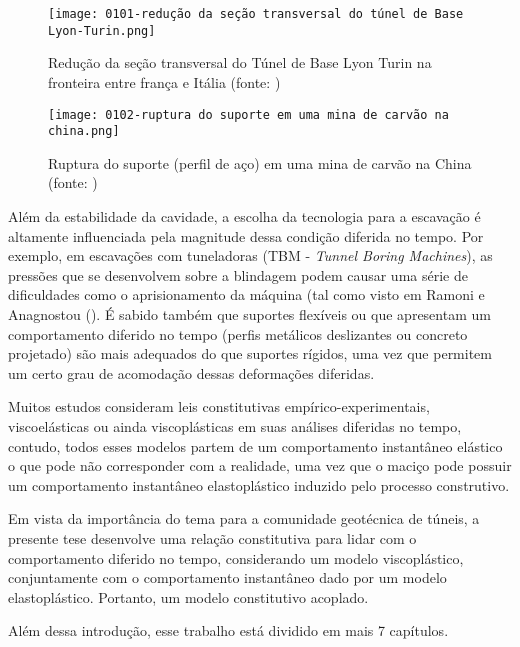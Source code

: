 \begin{figure}[H]
	\begin{center}
		\texttt{[image: 0101-redução da seção transversal do túnel de Base Lyon-Turin.png]}
	\end{center}
	\caption{\label{redução_base_turin}Redução da seção transversal do Túnel de Base Lyon Turin na fronteira entre frança e Itália (fonte: )}
\end{figure}

\begin{figure}[H]
	\begin{center}
		\texttt{[image: 0102-ruptura do suporte em uma mina de carvão na china.png]}
	\end{center}
	\caption{\label{ruptura_china}Ruptura do suporte (perfil de aço) em uma mina de carvão na China (fonte: )}
\end{figure}
 
Além da estabilidade da cavidade, a escolha da tecnologia para a escavação é altamente influenciada pela magnitude dessa condição diferida no tempo. Por exemplo, em escavações com tuneladoras (TBM - \textit{Tunnel Boring Machines}), as pressões que se desenvolvem sobre a blindagem podem causar uma série de dificuldades como o aprisionamento da máquina (tal como visto em Ramoni e Anagnostou (\citeyear{Ramoni2010a,Ramoni2010b}). É sabido também que suportes flexíveis ou que apresentam um comportamento diferido no tempo (perfis metálicos deslizantes ou concreto projetado) são mais adequados do que suportes rígidos, uma vez que permitem um certo grau de acomodação dessas deformações diferidas.

Muitos estudos consideram leis constitutivas empírico-experimentais, viscoelásticas ou ainda viscoplásticas em suas análises diferidas no tempo, contudo, todos esses modelos partem de um comportamento instantâneo elástico o que pode não corresponder com a realidade, uma vez que o maciço pode possuir um comportamento instantâneo elastoplástico induzido pelo processo construtivo.

Em vista da importância do tema para a comunidade geotécnica de túneis, a presente tese desenvolve uma relação constitutiva para lidar com o comportamento diferido no tempo, considerando um modelo viscoplástico, conjuntamente com o comportamento instantâneo dado por um modelo elastoplástico. Portanto, um modelo constitutivo acoplado.

Além dessa introdução, esse trabalho está dividido em mais 7 capítulos.

